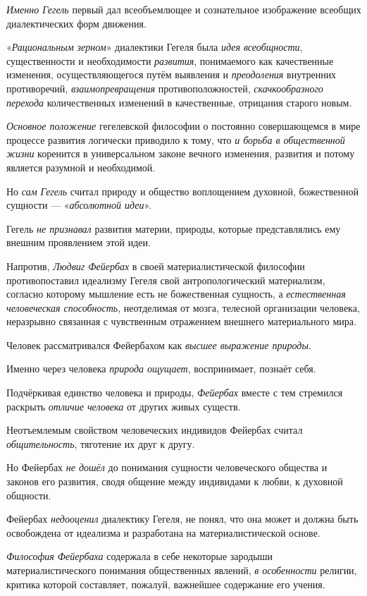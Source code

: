 \documentclass[a4paper,14pt,russian]{extreport}
\begin{document}
\emph{Именно Гегель} первый дал всеобъемлющее и сознательное изображение всеобщих диалектических форм движения.

«\emph{Рациональным зерном}» диалектики Гегеля была \emph{идея всеобщности}, существенности и необходимости \emph{развития}, понимаемого как качественные изменения, осуществляющегося путём выявления и \emph{преодоления} внутренних противоречий, \emph{взаимопревращения} противоположностей, \emph{скачкообразного перехода} количественных изменений в качественные, отрицания старого новым.

\emph{Основное положение} гегелевской философии о постоянно совершающемся в мире процессе развития логически приводило к тому, что \emph{и борьба в общественной жизни} коренится в универсальном законе вечного изменения, развития и потому является разумной и необходимой.

Но \emph{сам Гегель} считал природу и общество воплощением духовной, божественной сущности --- «\emph{абсолютной идеи}».

Гегель \emph{не признавал} развития материи, природы, которые представлялись ему внешним проявлением этой идеи.

Напротив, \emph{Людвиг Фейербах} в своей материалистической философии противопоставил идеализму Гегеля свой антропологический материализм, согласно которому мышление есть не божественная сущность, а \emph{естественная человеческая способность}, неотделимая от мозга, телесной организации человека, неразрывно связанная с чувственным отражением внешнего материального мира.

Человек рассматривался Фейербахом как \emph{высшее выражение природы}.

Именно через человека \emph{природа ощущает}, воспринимает, познаёт себя.

Подчёркивая единство человека и природы, \emph{Фейербах} вместе с тем стремился раскрыть \emph{отличие человека} от других живых существ.

Неотъемлемым свойством человеческих индивидов Фейербах считал \emph{общительность}, тяготение их друг к другу.

Но Фейербах \emph{не дошёл} до понимания сущности человеческого общества и законов его развития, сводя общение между индивидами к любви, к духовной общности.

Фейербах \emph{недооценил} диалектику Гегеля, не понял, что она может и должна быть освобождена от идеализма и разработана на материалистической основе.

\emph{Философия Фейербаха} содержала в себе некоторые зародыши материалистического понимания общественных явлений, \emph{в особенности} религии, критика которой составляет, пожалуй, важнейшее содержание его учения.
\end{document}
